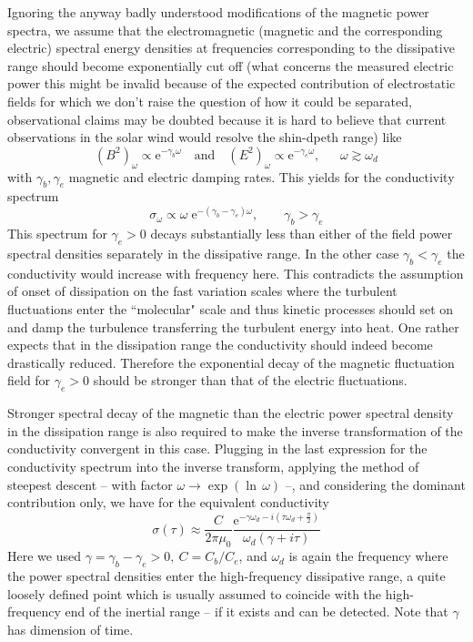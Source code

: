 \documentclass[ ]{copernicus2}
\begin{document}
{{{{Ignoring the anyway badly understood modifications of the magnetic power spectra, we assume that the electromagnetic (magnetic and the corresponding electric) spectral energy densities at frequencies corresponding to the dissipative range should become exponentially cut off (what concerns the measured electric power this might be invalid because of the expected contribution of electrostatic fields for which we don't raise the question of how it could be separated, observational claims may be doubted because it is hard to believe that current observations in the solar wind would resolve the shin-dpeth range)} like
\begin{equation}
(B^2)_\omega\propto\mathrm{e}^{-\gamma_b\omega}\quad\mathrm{and}\quad (E^2)_\omega\propto\mathrm{e}^{-\gamma_e\omega},~~~~~~~\omega\gtrsim\omega_d
\end{equation}
with $\gamma_b,\gamma_e$ magnetic and electric damping rates. This yields for the conductivity spectrum
\begin{equation}\label{eq-ans}
\sigma_\omega\propto\omega\;\mathrm{e}^{-(\gamma_b-\gamma_e)\omega}, \qquad \gamma_b>\gamma_e
\end{equation}
This spectrum  for $\gamma_e>0$ decays substantially less than either of the field power spectral densities separately in the dissipative range. In the other case $\gamma_b<\gamma_e$ the conductivity would increase with frequency here. This contradicts the assumption of onset of dissipation on the fast variation scales where the turbulent fluctuations enter the ``molecular" scale and thus kinetic processes should set on and damp the turbulence transferring the turbulent energy into heat. One rather expects that in the dissipation range the conductivity should indeed become drastically reduced. Therefore the exponential decay of the magnetic fluctuation field for $\gamma_e>0$ should be stronger than that of the electric fluctuations.

Stronger spectral decay of the magnetic than the electric power spectral density in the dissipation range is also required to make the inverse transformation of the conductivity convergent in this case. Plugging in the last expression for the conductivity spectrum into the inverse transform, applying the method of steepest descent -- with factor $\omega\to\exp(\ln\,\omega)$ --, and considering the dominant contribution only, we have for the equivalent conductivity
\begin{equation}
\sigma(\tau)\approx \frac{C}{2\pi\mu_0}\frac{\mathrm{e}^{-\gamma\omega_d-i(\tau\omega_d+\frac{\pi}{2})}}{\omega_d(\gamma+i\tau)}
\end{equation}
Here we used $\gamma=\gamma_b-\gamma_e>0,\ C=C_b/C_e$, and $\omega_d$ is again the frequency where the power spectral densities enter the high-frequency dissipative range, a quite loosely defined point which is usually assumed to coincide with the high-frequency end of the inertial range -- if it exists and can be detected. Note that $\gamma$ has dimension of time. 

}}}
\end{document}
